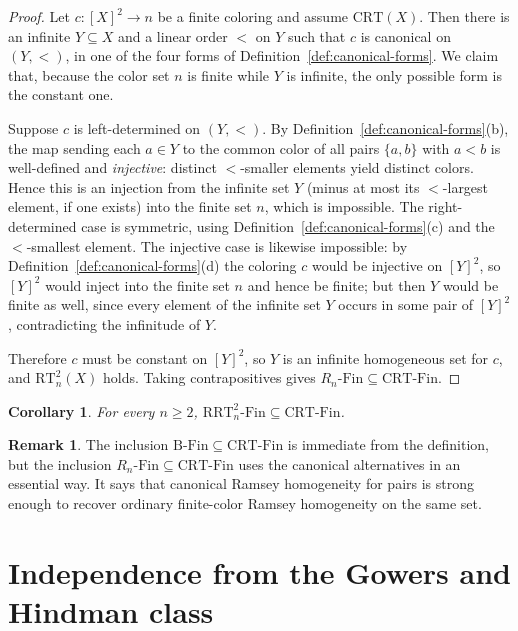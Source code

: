 \documentclass[11pt]{amsart}
\newtheorem{corollary}[theorem]{Corollary}
\theoremstyle{definition}
\newtheorem{remark}[theorem]{Remark}
\newcommand{\BFin}{\mathrm{B\text{-}Fin}}
\newcommand{\RnFin}[1]{R_{#1}\text{-}\mathrm{Fin}}
\newcommand{\RRT}{\mathrm{RRT}}
\newcommand{\CRT}{\mathrm{CRT}}
\newcommand{\RT}{\mathrm{RT}}
\newcommand{\RRTFin}[2]{\RRT^{#1}_{#2}\text{-}\mathrm{Fin}}
\newcommand{\CRTFin}{\CRT\text{-}\mathrm{Fin}}
\begin{document}
\begin{proof}
Let \(c:[X]^2\to n\) be a finite coloring and assume \(\CRT(X)\).  Then there is an infinite \(Y\subseteq X\) and a linear order \(<\) on \(Y\) such that \(c\) is canonical on \((Y,<)\), in one of the four forms of Definition~\ref{def:canonical-forms}.  We claim that, because the color set \(n\) is finite while \(Y\) is infinite, the only possible form is the constant one.

Suppose \(c\) is left-determined on \((Y,<)\).  By Definition~\ref{def:canonical-forms}(b), the map sending each \(a\in Y\) to the common color of all pairs \(\{a,b\}\) with \(a<b\) is well-defined and \emph{injective}: distinct \(<\)-smaller elements yield distinct colors.  Hence this is an injection from the infinite set \(Y\) (minus at most its \(<\)-largest element, if one exists) into the finite set \(n\), which is impossible.  The right-determined case is symmetric, using Definition~\ref{def:canonical-forms}(c) and the \(<\)-smallest element.  The injective case is likewise impossible: by Definition~\ref{def:canonical-forms}(d) the coloring \(c\) would be injective on \([Y]^2\), so \([Y]^2\) would inject into the finite set \(n\) and hence be finite; but then \(Y\) would be finite as well, since every element of the infinite set \(Y\) occurs in some pair of \([Y]^2\), contradicting the infinitude of \(Y\).

Therefore \(c\) must be constant on \([Y]^2\), so \(Y\) is an infinite homogeneous set for \(c\), and \(\RT^2_n(X)\) holds.  Taking contrapositives gives \(\RnFin{n}\subseteq\CRTFin\).
\end{proof}

\begin{corollary}
For every \(n\geq 2\), \(\RRTFin{2}{n}\subseteq \CRTFin\).
\end{corollary}

\begin{remark}
The inclusion \(\BFin\subseteq\CRTFin\) is immediate from the definition, but the inclusion \(\RnFin{n}\subseteq\CRTFin\) uses the canonical alternatives in an essential way.  It says that canonical Ramsey homogeneity for pairs is strong enough to recover ordinary finite-color Ramsey homogeneity on the same set.
\end{remark}

\section{Independence from the Gowers and Hindman class}\label{sec:independence}
\end{document}
